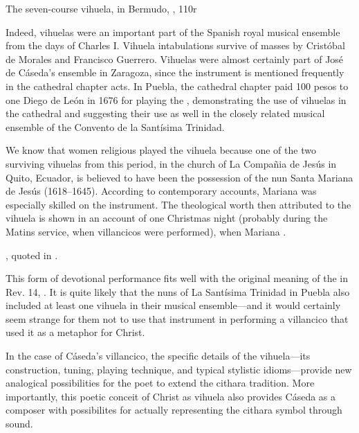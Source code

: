 {The seven-course vihuela, in Bermudo, , 110r}

Indeed, vihuelas were an important part of the Spanish royal musical ensemble
from the days of Charles I.
Vihuela intabulations survive of masses by Cristóbal de Morales and Francisco
Guerrero.%
    \autocite{Grove:Vihuela}
Vihuelas were almost certainly part of José de Cáseda's ensemble in Zaragoza,
since the instrument is mentioned frequently in the cathedral chapter acts.%
    \Autocite{Calahorra:Zaragoza2} %
In Puebla, the cathedral chapter paid 100 pesos to one Diego de León in 1676
for playing the , demonstrating the use of vihuelas in
the cathedral and suggesting their use as well in the closely related musical
ensemble of the Convento de la Santísima Trinidad.%
    \autocite[44]{PerezRuiz:Aportes} %

We know that women religious played the vihuela because one of the two
surviving vihuelas from this period, in the church of La Compañia de Jesús in
Quito, Ecuador, is believed to have been the possession of the nun Santa
Mariana de Jesús (1618--1645).
According to contemporary accounts, Mariana was especially skilled on the
instrument. 
The theological worth then attributed to the vihuela is shown in an account of
one Christmas night (probably during the Matins service, when villancicos were
performed), when Mariana .%
\begin{Footnote}
    \Autocite[275]{EspinosaPolit:SantaMariana}, quoted in
    \Autocite[73]{Bermudez:Vihuela}.
\end{Footnote}
This form of devotional performance fits well with the original meaning of the
 in Rev. 14, .%
    \Autocite{BDAG}
It is quite likely that the nuns of La Santísima Trinidad in Puebla also
included at least one vihuela in their musical ensemble---and it would
certainly seem strange for them not to use that instrument in performing a
villancico that used it as a metaphor for Christ.

In the case of Cáseda's villancico, the specific details of the vihuela---its
construction, tuning, playing technique, and typical stylistic idioms---provide
new analogical possibilities for the poet to extend the cithara tradition.
More importantly, this poetic conceit of Christ as vihuela also provides Cáseda
as a composer with possibilites for actually representing the cithara symbol
through sound.

